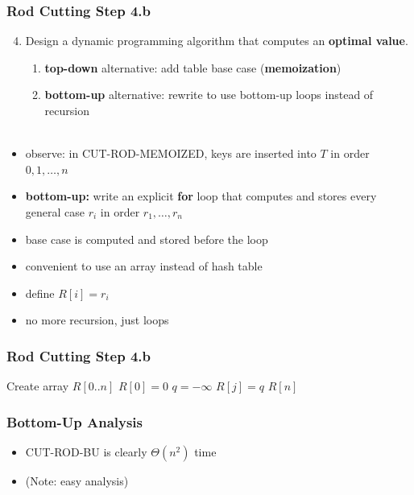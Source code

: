 \documentclass{beamer}
\newcommand{\stanza}{ \\~\ }
\begin{document}
\begin{frame} \frametitle{Rod Cutting Step 4.b}
  \begin{enumerate}
    \setcounter{enumi}{3}
    \item Design a dynamic programming algorithm that computes an \textbf{optimal value}.
    \begin{enumerate}
      \item \textbf{top-down} alternative: add table base case (\textbf{memoization})
      \item \textbf{bottom-up} alternative: rewrite to use bottom-up loops instead of recursion
      \stanza
    \end{enumerate}
\end{enumerate}

\begin{itemize}
  \item observe: in CUT-ROD-MEMOIZED, keys are inserted into $T$ in order $0, 1, \ldots, n$
  \item \textbf{bottom-up:} write an explicit \textbf{for} loop that computes and stores every general case $r_i$ in order $r_1, \ldots, r_n$
  \item base case is computed and stored before the loop
  \item convenient to use an array instead of hash table
  \item define $R[i] = r_i$
  \item no more recursion, just loops
\end{itemize}
\end{frame}

\begin{frame} \frametitle{Rod Cutting Step 4.b}
  {\small
  \begin{algorithmic}[1]
    \State Create array $R[0..n]$
    \State $R[0] = 0$
      \State $q=-\infty$
      \EndFor
      \State $R[j] = q$
    \EndFor
    \State \Return $R[n]$
    \EndFunction
  \end{algorithmic}
  }
\end{frame}

\begin{frame} \frametitle{Bottom-Up Analysis}
  \begin{itemize}
    \item CUT-ROD-BU is clearly $\Theta(n^2)$ time
    \item (Note: easy analysis)
  \end{itemize}
\end{frame}
\end{document}
